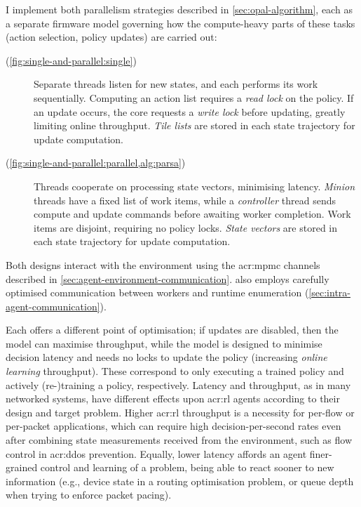 I implement both parallelism strategies described in \cref{sec:opal-algorithm}, each as a separate firmware model governing how the compute-heavy parts of these tasks (action selection, policy updates) are carried out:
\begin{description}
	\item[\Indfw{} (\cref{fig:single-and-parallel:single})] Separate threads listen for new states, and each performs its work sequentially. Computing an action list requires a \emph{read lock} on the policy. If an update occurs, the core requests a \emph{write lock} before updating, greatly limiting online throughput. \emph{Tile lists} are stored in each state trajectory for update computation.
	\item[\Coopfw{} (\cref{fig:single-and-parallel:parallel,alg:parsa})] Threads cooperate on processing state vectors, minimising latency. \emph{Minion} threads have a fixed list of work items, while a \emph{controller} thread sends compute and update commands before awaiting worker completion. Work items are disjoint, requiring no policy locks. \emph{State vectors} are stored in each state trajectory for update computation.
\end{description}
Both designs interact with the environment using the \gls{acr:mpmc} channels described in \cref{sec:agent-environment-communication}.
\Coopfw{} also employs carefully optimised communication between workers and runtime enumeration (\cref{sec:intra-agent-communication}).

Each offers a different point of optimisation; if updates are disabled, then the \indfw{} model can maximise throughput, while the \coopfw{} model is designed to minimise decision latency and needs no locks to update the policy (increasing \emph{online learning} throughput).
These correspond to only executing a trained policy and actively (re-)training a policy, respectively.
Latency and throughput, as in many networked systems, have different effects upon \gls{acr:rl} agents according to their design and target problem.
Higher \gls{acr:rl} throughput is a necessity for per-flow or per-packet applications, which can require high decision-per-second rates even after combining state measurements received from the environment, such as flow control in \gls{acr:ddos} prevention.
Equally, lower latency affords an agent finer-grained control and learning of a problem, being able to react sooner to new information (e.g., device state in a routing optimisation problem, or queue depth when trying to enforce packet pacing).

